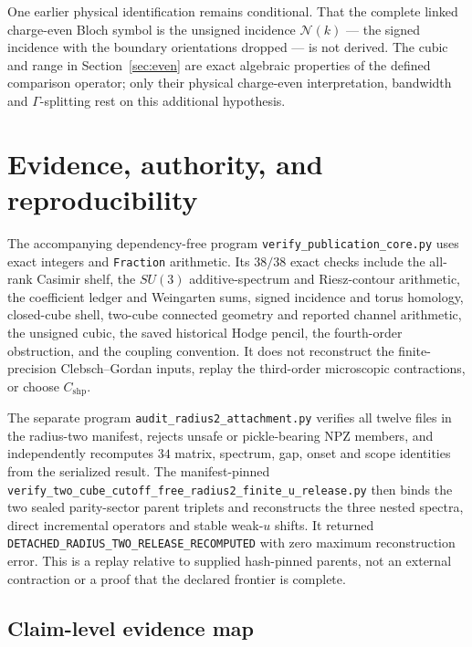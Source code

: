 \documentclass[11pt]{article}
\theoremstyle{plain}
\theoremstyle{definition}
\theoremstyle{remark}
\begin{document}
One earlier physical identification remains conditional. That the complete
linked charge-even Bloch symbol is the unsigned incidence
$\mathcal N(k)$ --- the signed incidence with the boundary orientations
dropped --- is not derived. The cubic and range in Section~\ref{sec:even} are
exact algebraic properties of the defined comparison operator; only their
physical charge-even interpretation, bandwidth and $\Gamma$-splitting rest on
this additional hypothesis.

\section{Evidence, authority, and reproducibility}
\label{sec:repro}

The accompanying dependency-free program
\texttt{verify\_publication\_core.py} uses exact integers and
\texttt{Fraction} arithmetic. Its $38/38$ exact checks include the all-rank
Casimir shelf, the $SU(3)$ additive-spectrum and Riesz-contour arithmetic, the
coefficient ledger and Weingarten sums, signed incidence and torus homology, closed-cube shell,
two-cube connected geometry and reported channel arithmetic, the unsigned
cubic, the saved historical Hodge pencil, the fourth-order obstruction, and
the coupling convention. It does not reconstruct the finite-precision
Clebsch--Gordan inputs, replay the third-order microscopic contractions, or
choose $C_{\mathrm{shp}}$.

The separate program \texttt{audit\_radius2\_attachment.py} verifies all
twelve files in the radius-two manifest, rejects unsafe or pickle-bearing NPZ
members, and independently recomputes $34$ matrix, spectrum, gap, onset and
scope identities from the serialized result. The manifest-pinned
\texttt{verify\_two\_cube\_cutoff\_free\_radius2\_finite\_u\_release.py}
then binds the two sealed parity-sector parent triplets and reconstructs the
three nested spectra, direct incremental operators and stable weak-$u$ shifts.
It returned
\texttt{DETACHED\_RADIUS\_TWO\_RELEASE\_RECOMPUTED} with zero maximum
reconstruction error. This is a replay relative to supplied hash-pinned
parents, not an external contraction or a proof that the declared frontier is
complete.

\subsection{Claim-level evidence map}
\end{document}
